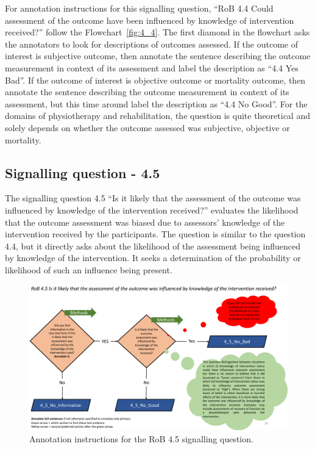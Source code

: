 \documentclass[sn-mathphys,Numbered]{sn-jnl}%
\begin{document}
For annotation instructions for this signalling question, ``RoB 4.4 Could assessment of the outcome have been influenced by knowledge of intervention received?'' follow the Flowchart~\ref{fig:4_4}.
The first diamond in the flowchart asks the annotators to look for descriptions of outcomes assessed.
If the outcome of interest is subjective outcome, then annotate the sentence describing the outcome measurement in context of its assessment and label the description as ``4.4 Yes Bad''.
If the outcome of interest is objective outcome or mortality outcome, then annotate the sentence describing the outcome measurement in context of its assessment, but this time around label the description as ``4.4 No Good''.
For the domains of physiotherapy and rehabilitation, the question is quite theoretical and solely depends on whether the outcome assessed was subjective, objective or mortality.


%
%
%
\subsection*{Signalling question - 4.5 }
%
The signalling question 4.5 ``Is it likely that the assessment of the outcome was influenced by knowledge of the intervention received?'' evaluates the likelihood that the outcome assessment was biased due to assessors' knowledge of the intervention received by the participants.
The question is similar to the question 4.4, but it directly asks about the likelihood of the assessment being influenced by knowledge of the intervention.
It seeks a determination of the probability or likelihood of such an influence being present.


%
%
%
\begin{figure}[htbp]
    \centering
    \includegraphics[width=\textwidth]{figures/4_5.pdf}
    \caption{Annotation instructions for the RoB 4.5 signalling question.}
    \label{fig:4_5}
\end{figure}
%
%
%
\end{document}
